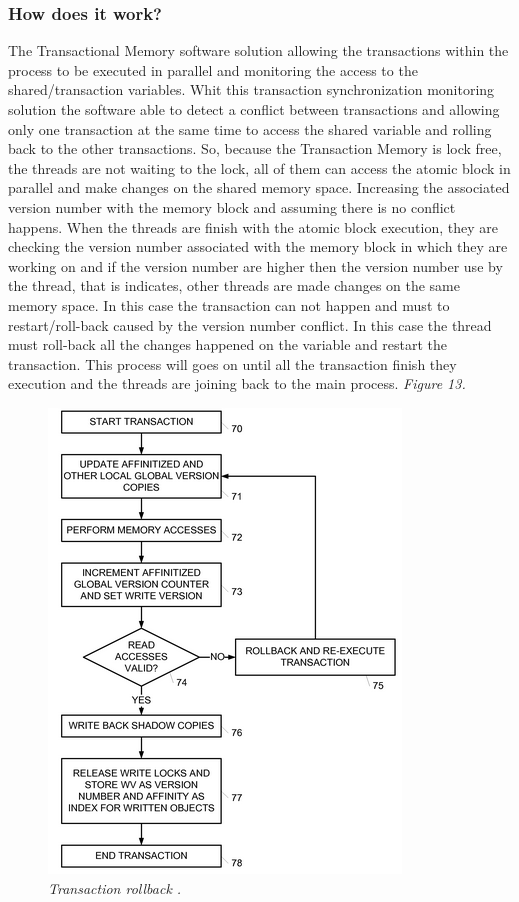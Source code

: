 \documentclass[12pt]{article}
\begin{document}
\subsubsection{How does it work?}
The Transactional Memory software solution allowing the transactions within the process to be executed in parallel and monitoring the access to the shared/transaction variables. Whit this transaction synchronization monitoring solution the software able to detect a conflict between transactions and allowing only one transaction at the same time to access the shared variable and rolling back to the other transactions. So, because the  Transaction Memory is lock free, the threads are not waiting to the lock, all of them can access the atomic block in parallel and make changes on the shared memory space. Increasing the associated version number with the memory block and assuming there is no conflict happens. When the threads are finish with the atomic block execution, they are checking the version number associated with the memory block in which they are working on and if the version number are higher then the version number use by the thread, that is indicates, other threads are made changes on the same memory space. In this case the transaction can not happen and must to restart/roll-back caused by the version number conflict. In this case the thread must roll-back all the changes happened on the variable and restart the transaction. This process will goes on until all the transaction finish they execution and the threads are joining back to the main process. \cite{Stack}\textit{\color{gray}Figure 13.}\\

\begin{figure}[h!]
\centering
\includegraphics[scale=0.3]{Pictures/rollback.png}
\caption{\textit{\color{gray}Transaction rollback \cite{Patent}.}}
\end{figure}
\end{document}
